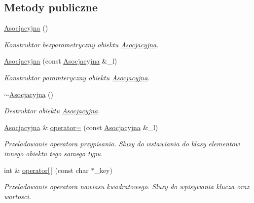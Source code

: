 \subsection*{Metody publiczne}
\begin{DoxyCompactItemize}
\item 
\hyperlink{struct_asocjacyjna_a1c65a8bcfb084dcdfa205b052fefd141}{Asocjacyjna} ()
\begin{DoxyCompactList}\small\item\em Konstruktor bezparametryczny obiektu \hyperlink{struct_asocjacyjna}{Asocjacyjna}. \end{DoxyCompactList}\item 
\hyperlink{struct_asocjacyjna_ae618986071c8d141f00df9d6319c0553}{Asocjacyjna} (const \hyperlink{struct_asocjacyjna}{Asocjacyjna} \&\-\_\-l)
\begin{DoxyCompactList}\small\item\em Konstruktor paramteryczny obiektu \hyperlink{struct_asocjacyjna}{Asocjacyjna}. \end{DoxyCompactList}\item 
\hyperlink{struct_asocjacyjna_aa33745fa9b42796199d58f29fa0cd8f0}{$\sim$\-Asocjacyjna} ()
\begin{DoxyCompactList}\small\item\em Destruktor obiektu \hyperlink{struct_asocjacyjna}{Asocjacyjna}. \end{DoxyCompactList}\item 
\hyperlink{struct_asocjacyjna}{Asocjacyjna} \& \hyperlink{struct_asocjacyjna_a23146fc43ca564cf2bf10c326800ffc6}{operator=} (const \hyperlink{struct_asocjacyjna}{Asocjacyjna} \&\-\_\-l)
\begin{DoxyCompactList}\small\item\em Przeladowanie operatora przypisania. Sluzy do wstawiania do klasy elementow innego obiektu tego samego typu. \end{DoxyCompactList}\item 
int \& \hyperlink{struct_asocjacyjna_a91b887ca6ab387a9649d80f6b892b70f}{operator\mbox{[}$\,$\mbox{]}} (const char $\ast$\-\_\-key)
\begin{DoxyCompactList}\small\item\em Przeladowanie operatora nawiasu kwadratowego. Sluzy do wpisywania klucza oraz wartosci. \end{DoxyCompactList}\end{DoxyCompactItemize}
